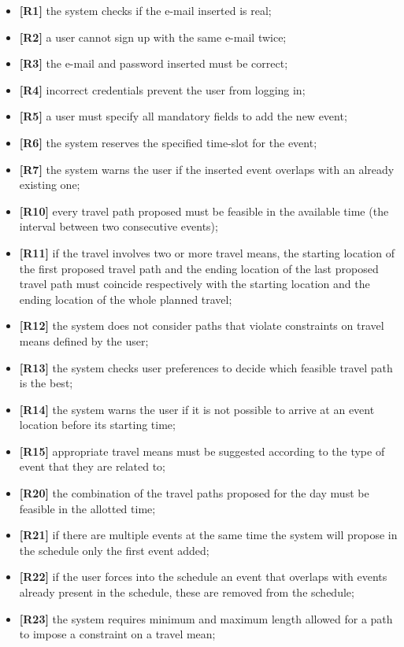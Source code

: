\begin{itemize}
	\item \textbf{[R1]} the system checks if the e-mail inserted is real;
	\item \textbf{[R2]} a user cannot sign up with the same e-mail twice;
	\item \textbf{[R3]} the e-mail and password inserted must be correct;
	\item \textbf{[R4]} incorrect credentials prevent the user from logging in; 
	\item \textbf{[R5]} a user must specify all mandatory fields to add the new event;
	\item \textbf{[R6]} the system reserves the specified time-slot for the event;
	\item \textbf{[R7]} the system warns the user if the inserted event overlaps with an already existing one;
	\item \textbf{[R10]} every travel path proposed must be feasible in the available time (the interval between two consecutive events);
	\item \textbf{[R11]} if the travel involves two or more travel means, the starting location of the first proposed travel path and the ending location of the last proposed travel path must coincide respectively with the starting location and the ending location of the whole planned travel;
	\item \textbf{[R12]} the system does not consider paths that violate constraints on travel means defined by the user;
	\item \textbf{[R13]} the system checks user preferences to decide which feasible travel path is the best;
	\item \textbf{[R14]} the system warns the user if it is not possible to arrive at an event location before its starting time;
	\item \textbf{[R15]} appropriate travel means must be suggested according to the type of event that they are related to; 
	\item \textbf{[R20]} the combination of the travel paths proposed for the day must be feasible in the allotted time;
	\item \textbf{[R21]} if there are multiple events at the same time the system will propose in the schedule only the first event added;
	\item \textbf{[R22]} if the user forces into the schedule an event that overlaps with events already present in the schedule, these are removed from the schedule;
	\item \textbf{[R23]} the system requires minimum and maximum length allowed for a path to impose a constraint on a travel mean;

\end{itemize}
